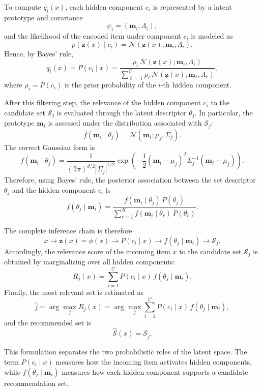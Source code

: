 \documentclass{article}
\begin{document}
To compute \(q_i(x)\), each hidden component \(c_i\) is represented by a latent prototype and covariance
\[
\psi_i=(\mathbf{m}_i,\Lambda_i),
\]
and the likelihood of the encoded item under component \(c_i\) is modeled as
\[
p(\mathbf{z}(x)\mid c_i)
=
\mathcal{N}\!\left(\mathbf{z}(x);\mathbf{m}_i,\Lambda_i\right).
\]
Hence, by Bayes' rule,
\[
q_i(x)
=
P(c_i\mid x)
=
\frac{
	\rho_i\,\mathcal{N}\!\left(\mathbf{z}(x);\mathbf{m}_i,\Lambda_i\right)
}{
	\sum_{\ell=1}^{C}
	\rho_\ell\,\mathcal{N}\!\left(\mathbf{z}(x);\mathbf{m}_\ell,\Lambda_\ell\right)
},
\]
where \(\rho_i=P(c_i)\) is the prior probability of the \(i\)-th hidden component.

After this filtering step, the relevance of the hidden component \(c_i\) to the candidate set \(\mathcal{S}_j\) is evaluated through the latent descriptor \(\theta_j\). In particular, the prototype \(\mathbf{m}_i\) is assessed under the distribution associated with \(\mathcal{S}_j\):
\[
f(\mathbf{m}_i\mid \theta_j)
=
\mathcal{N}(\mathbf{m}_i;\mu_j,\Sigma_j).
\]
The correct Gaussian form is
\[
f(\mathbf{m}_i\mid \theta_j)
=
\frac{1}{(2\pi)^{d/2}|\Sigma_j|^{1/2}}
\exp\left(
-\frac{1}{2}
(\mathbf{m}_i-\mu_j)^T
\Sigma_j^{-1}
(\mathbf{m}_i-\mu_j)
\right).
\]
Therefore, using Bayes' rule, the posterior association between the set descriptor \(\theta_j\) and the hidden component \(c_i\) is
\[
f(\theta_j\mid \mathbf{m}_i)
=
\frac{
	f(\mathbf{m}_i\mid \theta_j)\,P(\theta_j)
}{
	\sum_{r=1}^{K}
	f(\mathbf{m}_i\mid \theta_r)\,P(\theta_r)
}.
\]

The complete inference chain is therefore
\[
x
\longrightarrow
\mathbf{z}(x)=\phi(x)
\longrightarrow
P(c_i\mid x)
\longrightarrow
f(\theta_j\mid \mathbf{m}_i)
\longrightarrow
\mathcal{S}_j .
\]
Accordingly, the relevance score of the incoming item \(x\) to the candidate set \(\mathcal{S}_j\) is obtained by marginalizing over all hidden components:
\[
R_j(x)
=
\sum_{i=1}^{C}
P(c_i\mid x)\,
f(\theta_j\mid \mathbf{m}_i).
\]
Finally, the most relevant set is estimated as
\[
\widehat{j}
=
\arg\max_{j}
R_j(x)
=
\arg\max_{j}
\sum_{i=1}^{C}
P(c_i\mid x)\,
f(\theta_j\mid \mathbf{m}_i),
\]
and the recommended set is
\[
\widehat{\mathcal{S}}(x)=\mathcal{S}_{\widehat{j}}.
\]

This formulation separates the two probabilistic roles of the latent space. The term \(P(c_i\mid x)\) measures how the incoming item activates hidden components, while \(f(\theta_j\mid \mathbf{m}_i)\) measures how each hidden component supports a candidate recommendation set.
\end{document}
